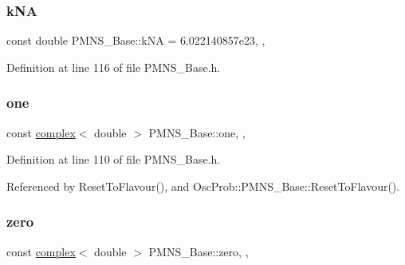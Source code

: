 \subsubsection{\texorpdfstring{k\+NA}{kNA}}
{\footnotesize\ttfamily const double P\+M\+N\+S\+\_\+\+Base\+::k\+NA = 6.\+022140857e23\hspace{0.3cm}{\ttfamily [static]}, {\ttfamily [protected]}, {\ttfamily [inherited]}}



Definition at line 116 of file P\+M\+N\+S\+\_\+\+Base.\+h.

\mbox{\label{classOscProb_1_1PMNS__Base_ab64aab27448a5aca27565c991a9d173e}} 
\subsubsection{\texorpdfstring{one}{one}}
{\footnotesize\ttfamily const \hyperlink{classOscProb_1_1PMNS__Base_ae86ec4718808ce9d02e5f5b4226714ab}{complex}$<$ double $>$ P\+M\+N\+S\+\_\+\+Base\+::one\hspace{0.3cm}{\ttfamily [static]}, {\ttfamily [protected]}, {\ttfamily [inherited]}}



Definition at line 110 of file P\+M\+N\+S\+\_\+\+Base.\+h.



Referenced by Reset\+To\+Flavour(), and Osc\+Prob\+::\+P\+M\+N\+S\+\_\+\+Base\+::\+Reset\+To\+Flavour().

\mbox{\label{classOscProb_1_1PMNS__Base_a5c31ed4593cf95feb36fb80c1850d25e}} 
\subsubsection{\texorpdfstring{zero}{zero}}
{\footnotesize\ttfamily const \hyperlink{classOscProb_1_1PMNS__Base_ae86ec4718808ce9d02e5f5b4226714ab}{complex}$<$ double $>$ P\+M\+N\+S\+\_\+\+Base\+::zero\hspace{0.3cm}{\ttfamily [static]}, {\ttfamily [protected]}, {\ttfamily [inherited]}}




